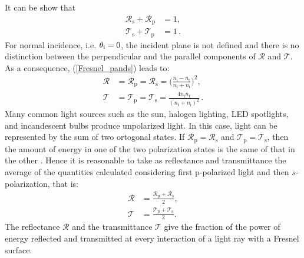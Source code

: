 It can be show that
\begin{equation}
\begin{split}
\mathcal{R}_\textrm{s}+\mathcal{R}_\textrm{p} &= 1,\\
\mathcal{T}_\textrm{s}+\mathcal{T}_\textrm{p} &=1\,.
\end{split}
\end{equation}
For normal incidence, i.e. $\theta_\textrm{i} = 0$, the incident plane is not defined and there is no distinction between the perpendicular and the parallel components of $\mathcal{R}$ and $\mathcal{T}$. As a consequence, (\ref{Fresnel_pands}) leads to:
\begin{equation}\label{eq:fresnel_pands2}
\begin{split}
\mathcal{R} &= \mathcal{R}_\textrm{p} = \mathcal{R}_\textrm{s} = \Bigg(\frac{n_\textrm{i}-n_\textrm{t}}{n_\textrm{t}+n_\textrm{i}}\Bigg)^2, \\
\mathcal{T} &= \mathcal{T}_\textrm{p} = \mathcal{T}_\textrm{s} = \frac{4n_\textrm{i} n_\textrm{t}}{(n_\textrm{t}+n_\textrm{i})^2}\,.
\end{split}
\end{equation}
\indent %
Many common light sources such as the sun, halogen lighting, LED spotlights, and incandescent bulbs produce unpolarized light. 
In this case, light can be represented by the sum of two ortogonal states. If $\mathcal{R}_\textrm{p} = \mathcal{R}_\textrm{s}$ and $\mathcal{T}_\textrm{p} = \mathcal{T}_\textrm{s}$, then the amount of energy in one of the two polarization states is the same of that in the other \cite{hecht1998hecht}.
Hence it is reasonable to take as reflectance and transmittance the average of the quantities calculated considering first p-polarized light and then $s$-polarization, that is:
\begin{equation}\begin{split}
\mathcal{R} &= \frac{\mathcal{R}_\textrm{p}+ \mathcal{R}_\textrm{s}}{2},\\
\mathcal{T} &= \frac{\mathcal{T}_\textrm{p}+ \mathcal{T}_\textrm{s}}{2}.
\end{split}
\label{eq:RandTin2D}
\end{equation}
The reflectance $\mathcal{R}$ and the transmittance $\mathcal{T}$ give the fraction of the power of energy reflected and transmitted at every interaction of a light ray with a Fresnel surface.
